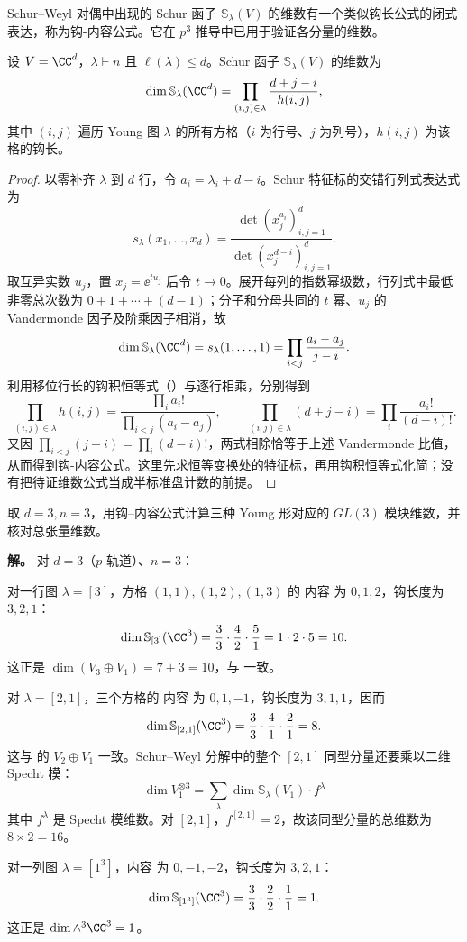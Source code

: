 Schur--Weyl 对偶中出现的 Schur 函子 $\mathbb{S}_\lambda(V)$ 的维数有一个类似钩长公式的闭式表达，称为钩-内容公式。它在 $p^3$ 推导中已用于验证各分量的维数。

\begin{proposition}
\label{prop:hook-content}
设 $V=\CC^d$，$\lambda\vdash n$ 且 $\ell(\lambda)\le d$。Schur 函子 $\mathbb{S}_\lambda(V)$ 的维数为
\begin{equation}
\dim\mathbb{S}_\lambda(\CC^d)
=\prod_{(i,j)\in\lambda}\frac{d+j-i}{h(i,j)},
\label{eq:hook-content-full}
\end{equation}
其中 $(i,j)$ 遍历 Young 图 $\lambda$ 的所有方格（$i$ 为行号、$j$ 为列号），$h(i,j)$ 为该格的钩长。

\end{proposition}

\begin{proof}
以零补齐 $\lambda$ 到 $d$ 行，令 $a_i=\lambda_i+d-i$。Schur 特征标的交错行列式表达式为
\[
s_\lambda(x_1,\dots,x_d)
=\frac{\det(x_j^{a_i})_{i,j=1}^d}{\det(x_j^{d-i})_{i,j=1}^d}.
\]
取互异实数 $u_j$，置 $x_j=\ee^{tu_j}$ 后令 $t\to0$。展开每列的指数幂级数，行列式中最低非零总次数为 $0+1+\cdots+(d-1)$；分子和分母共同的 $t$ 幂、$u_j$ 的 Vandermonde 因子及阶乘因子相消，故
\[
\dim\mathbb S_\lambda(\CC^d)=s_\lambda(1,\dots,1)
=\prod_{i<j}\frac{a_i-a_j}{j-i}.
\]
利用移位行长的钩积恒等式（）与逐行相乘，分别得到
\[
\prod_{(i,j)\in\lambda}h(i,j)
=\frac{\prod_i a_i!}{\prod_{i<j}(a_i-a_j)},
\qquad
\prod_{(i,j)\in\lambda}(d+j-i)
=\prod_i\frac{a_i!}{(d-i)!}.
\]
又因 $\prod_{i<j}(j-i)=\prod_i(d-i)!$，两式相除恰等于上述 Vandermonde 比值，从而得到钩-内容公式。这里先求恒等变换处的特征标，再用钩积恒等式化简；没有把待证维数公式当成半标准盘计数的前提。
\end{proof}

\begin{example}[{钩-内容公式验证}]
\label{ex:hook-content-check}
取 $d=3,n=3$，用钩--内容公式计算三种 Young 形对应的 $GL(3)$ 模块维数，并核对总张量维数。

\textbf{解。} 对 $d=3$（$p$ 轨道）、$n=3$：

对一行图 $\lambda=[3]$，方格 $(1,1),(1,2),(1,3)$ 的 内容 为 $0,1,2$，钩长度为 $3,2,1$：
\[
\dim\mathbb{S}_{[3]}(\CC^3)=\frac{3}{3}\cdot\frac{4}{2}\cdot\frac{5}{1}=1\cdot2\cdot5=10.
\]
这正是 $\dim(V_3\oplus V_1)=7+3=10$，与  一致。

对 $\lambda=[2,1]$，三个方格的 内容 为 $0,1,-1$，钩长度为 $3,1,1$，因而
\[
\dim\mathbb{S}_{[2,1]}(\CC^3)
=\frac{3}{3}\cdot\frac{4}{1}\cdot\frac{2}{1}=8.
\]
这与  的 \(V_2\oplus V_1\) 一致。Schur--Weyl 分解中的整个 $[2,1]$ 同型分量还要乘以二维 Specht 模：
\[
\dim V_1^{\otimes3}=\sum_\lambda\dim\mathbb{S}_\lambda(V_1)\cdot f^\lambda
\]
其中 $f^\lambda$ 是 Specht 模维数。对 $[2,1]$，$f^{[2,1]}=2$，故该同型分量的总维数为 $8\times2=16$。

对一列图 $\lambda=[1^3]$，内容 为 $0,-1,-2$，钩长度为 $3,2,1$：
\[
\dim\mathbb{S}_{[1^3]}(\CC^3)=\frac{3}{3}\cdot\frac{2}{2}\cdot\frac{1}{1}=1.
\]
这正是 $\dim\wedge^3\CC^3=1$。
\end{example}

